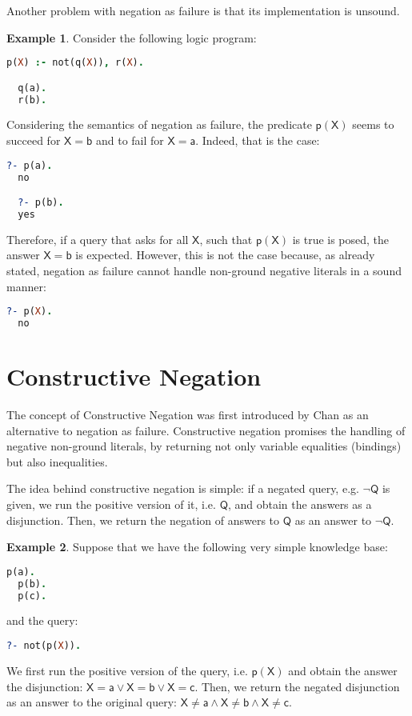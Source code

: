 \documentclass[inscr,ack,preface]{dithesis}
\theoremstyle{definition}
\newtheorem{example}{Example}[chapter]
\newcommand{\msf}[1]{$\mathsf{#1}$}
\begin{document}
Another problem with negation as failure is that its implementation is unsound.
\begin{example} Consider the following logic program:
\begin{lstlisting}[language=Prolog,frame=single]
  p(X) :- not(q(X)), r(X).

  q(a).
  r(b).
\end{lstlisting}
Considering the semantics of negation as failure, the predicate \msf{p(X)} seems to succeed for \msf{X = b} and to fail for \msf{X = a}. Indeed, that is the case:
\begin{lstlisting}[language=Prolog,frame=single]
  ?- p(a).
  no

  ?- p(b).
  yes
\end{lstlisting}
Therefore, if a query that asks for all \msf{X}, such that \msf{p(X)} is true is posed, the answer \msf{X = b} is expected. However, this is not the case because, as already stated, negation as failure cannot handle non-ground negative literals in a sound manner:
\begin{lstlisting}[language=Prolog,frame=single]
  ?- p(X).
  no
\end{lstlisting}
\end{example}


\section{Constructive Negation}
The concept of Constructive Negation was first introduced by Chan \cite{DBLP:conf/iclp/Chan88} as an alternative to negation as failure. Constructive negation promises the handling of negative non-ground literals, by returning not only variable equalities (bindings) but also inequalities.

The idea behind constructive negation is simple: if a negated query, e.g. \msf{\lnot Q} is given, we run the positive version of it, i.e. \msf{Q}, and obtain the answers as a disjunction. Then, we return the negation of answers to \msf{Q} as an answer to \msf{\lnot Q}.

\begin{example} Suppose that we have the following very simple knowledge base:
\begin{lstlisting}[language=Prolog,frame=single]
  p(a).
  p(b).
  p(c).
\end{lstlisting}
and the query:
\begin{lstlisting}[language=Prolog,frame=single]
  ?- not(p(X)).
\end{lstlisting}
We first run the positive version of the query, i.e. \msf{p(X)} and obtain the answer the disjunction: \msf{X = a \lor X = b \lor X = c}. Then, we return the negated disjunction as an answer to the original query: \msf{X \ne a \land X \ne b \land X \ne c}.
\end{example}
\end{document}
